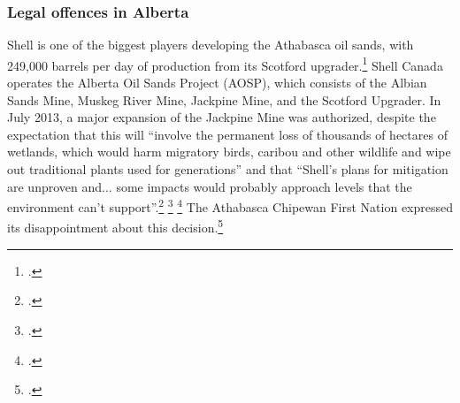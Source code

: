 \documentclass[10pt]{article}
\begin{document}
	\subsubsection{Legal offences in Alberta}
	


Shell is one of the biggest players developing the Athabasca oil sands, with 249,000 barrels per day of production from its Scotford upgrader.\footcite{AlbertaEnergy}
Shell Canada operates the Alberta Oil Sands Project (AOSP), which consists of the Albian Sands Mine, Muskeg River Mine, Jackpine Mine, and the Scotford Upgrader. 
In July 2013, a major expansion of the Jackpine Mine was authorized, despite the expectation that this will ``involve the permanent loss of thousands of hectares of wetlands, which would harm migratory birds, caribou and other wildlife and wipe out traditional plants used for generations'' and that ``Shell's plans for mitigation are unproven and... some impacts would probably approach levels that the environment can't support''.\footcite[][]{JointReviewPanelJackpine} \footcite[][]{AlbertaGreenlightsJackpine} \footcite[][]{JackpineConcerns}
The Athabasca Chipewan First Nation expressed its disappointment about this decision.\footcite[][]{ACFNDisappointed}
\end{document}
